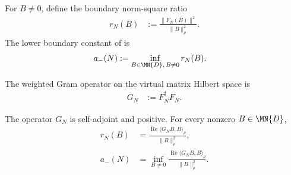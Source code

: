 \begin{definition}
    \label{def:fnw_lower_boundary_constant}
    \leanok
    For $B\neq0$, define the boundary norm-square ratio
    \begin{align}
        r_N(B)
         & :=\frac{\lVert F_N(B)\rVert^2}{\lVert B\rVert_\rho^2}.
        \label{eq:fnw_boundary_ratio}
    \end{align}
    The lower boundary constant of
    \cite[Lemma~5.3]{Fannes1992Finitely} is
    \begin{align}
        a_-(N)
         & :=\inf_{B\in\MN{D},\,B\neq0}r_N(B).
        \label{eq:fnw_lower_boundary_constant}
    \end{align}
\end{definition}

\begin{definition}
    \label{def:fnw_boundary_gram}
    \leanok
    The weighted Gram operator on the virtual matrix Hilbert space is
    \begin{align}
        G_N & :=F_N^\dagger F_N.
        \label{eq:fnw_boundary_gram}
    \end{align}
\end{definition}

\begin{lemma}
    \label{thm:fnw_lower_boundary_rayleigh}
    \leanok
    The operator $G_N$ is self-adjoint and positive. For every nonzero
    $B\in\MN{D}$,
    \begin{align}
        r_N(B)
         & =\frac{\operatorname{Re}\langle G_NB,B\rangle_\rho}
        {\lVert B\rVert_\rho^2},
        \label{eq:fnw_boundary_rayleigh_ratio}                 \\
        a_-(N)
         & =\inf_{B\neq0}
        \frac{\operatorname{Re}\langle G_NB,B\rangle_\rho}
        {\lVert B\rVert_\rho^2}.
        \label{eq:fnw_lower_boundary_rayleigh}
    \end{align}
\end{lemma}

